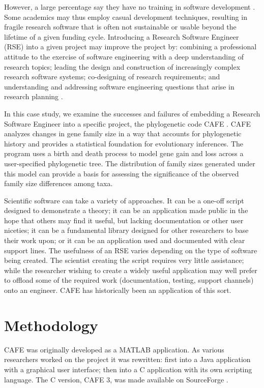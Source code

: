 \documentclass[acmtog, authorversion]{acmart}
\begin{document}
However, a large percentage say they have no training in software development \cite{Hettrick14}. Some academics may thus employ casual development techniques, resulting in fragile research software that is often not sustainable or usable beyond the lifetime of a given funding cycle. Introducing a Research Software Engineer (RSE) into a given project may improve the project by: combining a professional attitude to the exercise of software engineering with a deep understanding of research topics; leading the design and construction of increasingly complex research software systems; co-designing of research requirements; and understanding and addressing software engineering questions that arise in research planning \cite{Baxter12}.

In this case study, we examine the successes and failures of embedding a Research Software Engineer into a specific project, the phylogenetic code CAFE \cite{Hahn2005}. CAFE analyzes changes in gene family size in a way that accounts for phylogenetic history and provides a statistical foundation for evolutionary inferences. The program uses a birth and death process to model gene gain and loss across a user-specified phylogenetic tree. The distribution of family sizes generated under this model can provide a basis for assessing the significance of the observed family size differences among taxa.

Scientific software can take a variety of approaches. It can be a one-off script designed to demonstrate a theory; it can be an application made public in the hope that others may find it useful, but lacking documentation or other user niceties; it can be a fundamental library designed for other researchers to base their work upon; or it can be an application used and documented with clear support lines. The usefulness of an RSE varies depending on the type of software being created. The scientist creating the script requires very little assistance; while the researcher wishing to create a widely useful application may well prefer to offload some of the required work (documentation, testing, support channels) onto an engineer. CAFE has historically been an application of this sort.

\section{Methodology}
CAFE was originally developed as a MATLAB application. As various researchers worked on the project it was rewritten: first into a Java application with a graphical user interface; then into a C application with its own scripting language. The C version, CAFE 3, was made available on SourceForge \cite{SourceForge}. 
\end{document}
